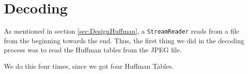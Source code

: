 \section{Decoding}
As mentioned in section \ref{sec:DesignHuffman}, a \lstinline|StreamReader| reads from a file from the beginning towards the end.
Thus, the first thing we did in the decoding process was to read the Huffman tables from the JPEG file. 

We do this four times, since we got four Huffman Tables.

